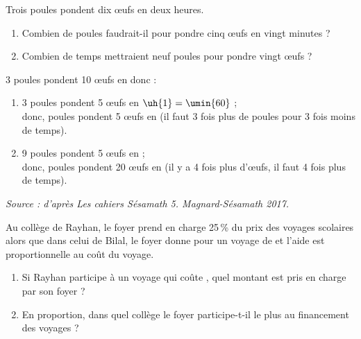 \begin{colonne*exercice}
\bigskip


\begin{exercice} %
   Trois poules pondent dix \oe ufs en deux heures.
   \begin{enumerate}
      \item Combien de poules faudrait-il pour pondre cinq \oe ufs en vingt minutes ?
      \item Combien de temps mettraient neuf poules pour pondre vingt \oe ufs ?
   \end{enumerate}
\end{exercice}

\begin{corrige}
   3 poules pondent 10 \oe ufs en  donc : \\
   \begin{enumerate}
      \item 3 poules pondent 5 \oe ufs en $\uh{1} =\umin{60}$ ; \\
         donc, { poules pondent 5 \oe ufs en } (il faut 3 fois plus de poules pour 3 fois moins de temps). \\
      \item 9 poules pondent 5 \oe ufs en  ; \\
         donc, { poules pondent 20 \oe ufs en } (il y a 4 fois plus d'\oe ufs, il faut 4 fois plus de temps). \\
   \end{enumerate}
\end{corrige}

\bigskip


\hfill {\it\footnotesize Source : d'après Les cahiers Sésamath 5. Magnard-Sésamath 2017.}



\begin{exercice} %
   Au collège de Rayhan, le foyer prend en charge 25\,\% du prix des voyages scolaires alors que dans celui de Bilal, le foyer donne  pour un voyage de  et l'aide est proportionnelle au coût du voyage.
   \begin{enumerate}
      \item Si Rayhan participe à un voyage qui coûte , quel montant est pris en charge par son foyer ?
      \item En proportion, dans quel collège le foyer participe-t-il le plus au financement des voyages ?
   \end{enumerate}
\end{exercice}


\end{colonne*exercice}
